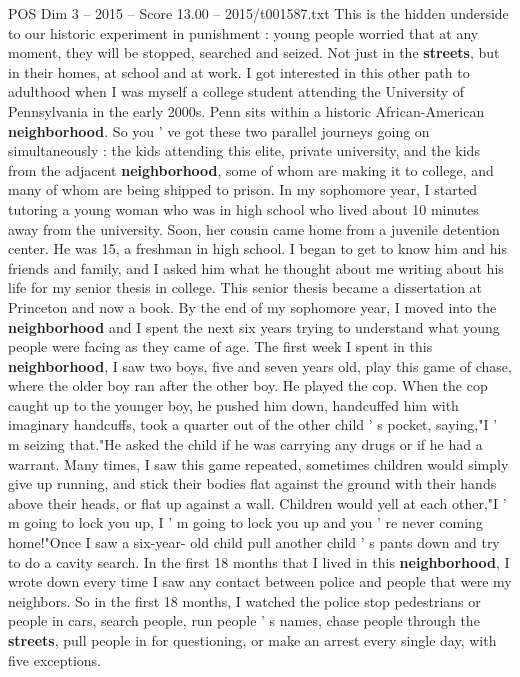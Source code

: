 \begin{textsample}{POS Dim 3 – 2015 – Score 13.00 – 2015/t001587.txt}
This is the hidden underside to our historic experiment in punishment : young people worried that at any moment, they will be stopped, searched and seized.
Not just in the \textbf{streets}, but in their homes, at school and at work.
I got interested in this other path to adulthood when I was myself a college student attending the University of Pennsylvania in the early 2000s.
Penn sits within a historic African-American \textbf{neighborhood}.
So you ' ve got these two parallel journeys going on simultaneously : the kids attending this elite, private university, and the kids from the adjacent \textbf{neighborhood}, some of whom are making it to college, and many of whom are being shipped to prison.
In my sophomore year, I started tutoring a young woman who was in high school who lived about 10 minutes away from the university.
Soon, her cousin came home from a juvenile detention center.
He was 15, a freshman in high school.
I began to get to know him and his friends and family, and I asked him what he thought about me writing about his life for my senior thesis in college.
This senior thesis became a dissertation at Princeton and now a book.
By the end of my sophomore year, I moved into the \textbf{neighborhood} and I spent the next six years trying to understand what young people were facing as they came of age.
The first week I spent in this \textbf{neighborhood}, I saw two boys, five and seven years old, play this game of chase, where the older boy ran after the other boy.
He played the cop.
When the cop caught up to the younger boy, he pushed him down, handcuffed him with imaginary handcuffs, took a quarter out of the other child ' s pocket, saying,"I ' m seizing that."He asked the child if he was carrying any drugs or if he had a warrant.
Many times, I saw this game repeated, sometimes children would simply give up running, and stick their bodies flat against the ground with their hands above their heads, or flat up against a wall.
Children would yell at each other,"I ' m going to lock you up, I ' m going to lock you up and you ' re never coming home!"Once I saw a six-year- old child pull another child ' s pants down and try to do a cavity search.
In the first 18 months that I lived in this \textbf{neighborhood}, I wrote down every time I saw any contact between police and people that were my neighbors.
So in the first 18 months, I watched the police stop pedestrians or people in cars, search people, run people ' s names, chase people through the \textbf{streets}, pull people in for questioning, or make an arrest every single day, with five exceptions.

\end{textsample}

